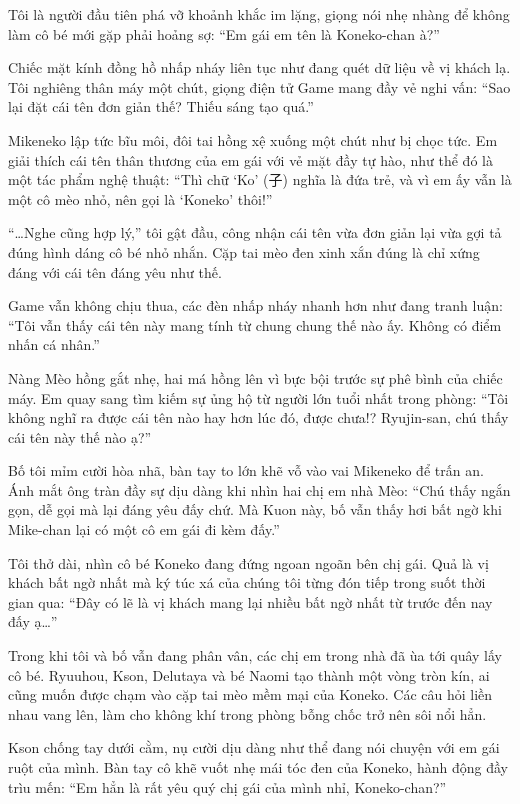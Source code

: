 ﻿\documentclass[../main.tex]{subfiles}
\begin{document}
Tôi là người đầu tiên phá vỡ khoảnh khắc im lặng, giọng nói nhẹ nhàng để không làm cô bé mới gặp phải hoảng sợ: ``Em gái em tên là Koneko-chan à?''

Chiếc mặt kính đồng hồ nhấp nháy liên tục như đang quét dữ liệu về vị khách lạ. Tôi nghiêng thân máy một chút, giọng điện tử Game mang đầy vẻ nghi vấn: ``Sao lại đặt cái tên đơn giản thế? Thiếu sáng tạo quá.''

Mikeneko lập tức bĩu môi, đôi tai hồng xệ xuống một chút như bị chọc tức. Em giải thích cái tên thân thương của em gái với vẻ mặt đầy tự hào, như thể đó là một tác phẩm nghệ thuật: ``Thì chữ `Ko' (子) nghĩa là đứa trẻ, và vì em ấy vẫn là một cô mèo nhỏ, nên gọi là `Koneko' thôi!''

``\dots Nghe cũng hợp lý,'' tôi gật đầu, công nhận cái tên vừa đơn giản lại vừa gợi tả đúng hình dáng cô bé nhỏ nhắn. Cặp tai mèo đen xinh xắn đúng là chỉ xứng đáng với cái tên đáng yêu như thế.

Game vẫn không chịu thua, các đèn nhấp nháy nhanh hơn như đang tranh luận: ``Tôi vẫn thấy cái tên này mang tính từ chung chung thế nào ấy. Không có điểm nhấn cá nhân.''

Nàng Mèo hồng gắt nhẹ, hai má hồng lên vì bực bội trước sự phê bình của chiếc máy. Em quay sang tìm kiếm sự ủng hộ từ người lớn tuổi nhất trong phòng: ``Tôi không nghĩ ra được cái tên nào hay hơn lúc đó, được chưa!? Ryujin-san, chú thấy cái tên này thế nào ạ?''

Bố tôi mỉm cười hòa nhã, bàn tay to lớn khẽ vỗ vào vai Mikeneko để trấn an. Ánh mắt ông tràn đầy sự dịu dàng khi nhìn hai chị em nhà Mèo: ``Chú thấy ngắn gọn, dễ gọi mà lại đáng yêu đấy chứ. Mà Kuon này, bố vẫn thấy hơi bất ngờ khi Mike-chan lại có một cô em gái đi kèm đấy.''

Tôi thở dài, nhìn cô bé Koneko đang đứng ngoan ngoãn bên chị gái. Quả là vị khách bất ngờ nhất mà ký túc xá của chúng tôi từng đón tiếp trong suốt thời gian qua: ``Đây có lẽ là vị khách mang lại nhiều bất ngờ nhất từ trước đến nay đấy ạ\dots''

Trong khi tôi và bố vẫn đang phân vân, các chị em trong nhà đã ùa tới quây lấy cô bé. Ryuuhou, Kson, Delutaya và bé Naomi tạo thành một vòng tròn kín, ai cũng muốn được chạm vào cặp tai mèo mềm mại của Koneko. Các câu hỏi liền nhau vang lên, làm cho không khí trong phòng bỗng chốc trở nên sôi nổi hẳn.

Kson chống tay dưới cằm, nụ cười dịu dàng như thể đang nói chuyện với em gái ruột của mình. Bàn tay cô khẽ vuốt nhẹ mái tóc đen của Koneko, hành động đầy trìu mến: ``Em hẳn là rất yêu quý chị gái của mình nhỉ, Koneko-chan?''
\end{document}
